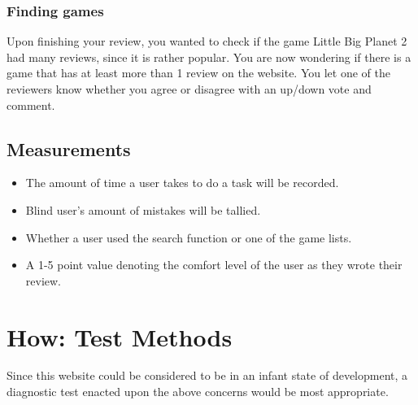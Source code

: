 \documentclass[11pt]{extarticle}
\begin{document}
   \subsubsection*{Finding games}
      Upon finishing your review, you wanted to check if the game Little Big Planet 2 had many reviews, since it is
      rather popular. You are now wondering if there is a game that has at least more than 1 review
      on the website. You let one of the reviewers know whether you agree or disagree with an up/down vote
      and comment.
\subsection*{Measurements}
   \begin{itemize}
   \item The amount of time a user takes to do a task will be recorded. 
   \item Blind user's amount of mistakes will be tallied.
   \item Whether a user used the search function or one of the game lists.
   \item A 1-5 point value denoting the comfort level of the user as they wrote their review.
   \end{itemize}
\section*{How: Test Methods}
   Since this website could be considered to be in an infant state of development, a diagnostic test
   enacted upon the above concerns would be most appropriate.
\end{document}
